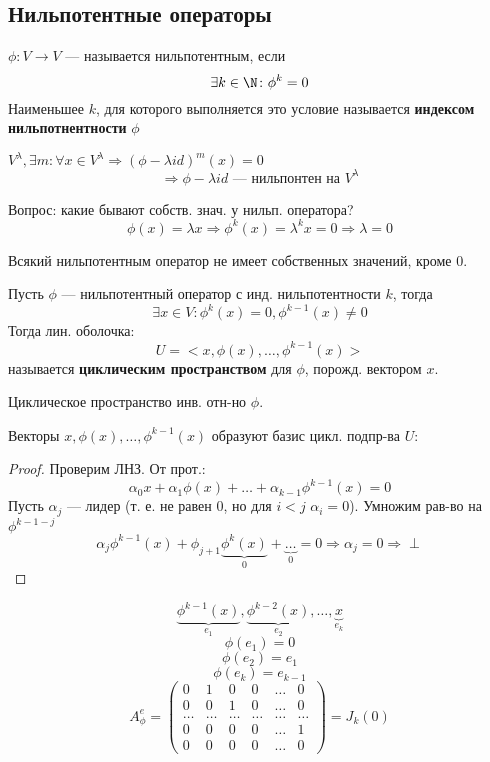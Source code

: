 \subsection{Нильпотентные операторы}
\begin{definition}
$\phi \colon V \rightarrow V$ --- называется нильпотентным, если
\[
  \exists k \in \N \colon \phi^{k} = 0
\]
Наименьшее $k$, для которого выполняется это условие называется \textbf{индексом нильпотнентности} $\phi$
\end{definition}
\begin{example}
$V^{\lambda}, \exists m \colon \forall x \in V^{\lambda} \Rightarrow (\phi - \lambda id)^{m}(x) = 0$
\[
\Rightarrow \phi - \lambda id \text{ --- нильпонтен на $V^{\lambda}$}
\]
\end{example}
Вопрос: какие бывают собств. знач. у нильп. оператора?
\[
\phi(x) = \lambda x \Rightarrow \phi^{k}(x) = \lambda^{k} x = 0 \Rightarrow \lambda = 0
\]
\begin{note}
Всякий нильпотентным оператор не имеет собственных значений, кроме $0$.
\end{note}
\begin{definition}
Пусть $\phi$ --- нильпотентный оператор с инд. нильпотентности $k$, тогда
\[
  \exists x \in V \colon \phi^{k}(x) = 0, \phi^{k - 1}(x) \neq 0
\]
Тогда лин. оболочка:
\[
  U = <x, \phi(x), \ldots, \phi^{k - 1}(x)>
\]
называется \textbf{циклическим пространством} для $\phi$, порожд. вектором $x$.
\end{definition}
\begin{note}
  Циклическое пространство инв. отн-но $\phi$.
\end{note}
\begin{statement}
\label{statement:05_4}
Векторы $x, \phi(x), \ldots, \phi^{k - 1}(x)$ образуют базис цикл. подпр-ва $U$:
\end{statement}
\begin{proof}
Проверим ЛНЗ. От прот.:
\[
  \alpha_0 x + \alpha_1 \phi(x) + \ldots + \alpha_{k - 1} \phi^{k - 1}(x) = 0
\]
Пусть $\alpha_j$ --- лидер (т. е. не равен $0$, но для $i < j$ $\alpha_i = 0$). Умножим рав-во на $\phi^{k - 1 - j}$
\[
\alpha_j \phi^{k - 1}(x) + \phi_{j + 1}\underbrace{\phi^{k}(x)}_{0} + \underbrace{\ldots}_{0} = 0 \Rightarrow \alpha_j = 0 \Rightarrow \perp
\]
\end{proof}
\[
\underbrace{\phi^{k - 1}(x)}_{e_1}, \underbrace{\phi^{k - 2}(x)}_{e_2}, \ldots, \underbrace{x}_{e_k}
\]
\[
\phi(e_1) = 0
\]
\[
\phi(e_2) = e_1
\]
\[
\phi(e_k) = e_{k - 1}
\]
\[
  A_{\phi}^{e} = \begin{pmatrix} 0 & 1 & 0 & 0 & \ldots & 0 \\ 0 & 0 & 1 & 0 & \ldots & 0 \\ \ldots & \ldots & \ldots & \ldots & \ldots & \ldots \\ 0 & 0 & 0 & 0 & \ldots & 1 \\ 0 & 0 & 0 & 0 & \ldots & 0 \end{pmatrix} = J_k(0)
\]
